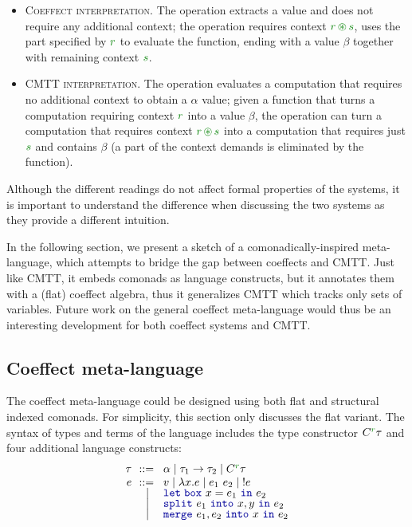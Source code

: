 \begin{itemize}
\item \textsc{Coeffect interpretation.} The  operation extracts a value
  and does not require any additional context; the  operation requires
  context $\cclrd{r}\,\cseq\,\cclrd{s}$, uses the part specified by $\cclrd{r}$ to
  evaluate the function, ending with a value $\beta$ together with remaining context
  $\cclrd{s}$.
\item \textsc{CMTT interpretation.} The  operation evaluates a computation
  that requires no additional context to obtain a $\alpha$ value; given a function that
  turns a computation requiring context $\cclrd{r}$ into a value $\beta$, the 
  operation can turn a computation that requires context $\cclrd{r}\,\cseq\,\cclrd{s}$
  into a computation that requires just $\cclrd{s}$ and contains $\beta$ (a part of the
  context demands is eliminated by the function).
\end{itemize}

\noindent
Although the different readings do not affect formal properties of the systems, it is important
to understand the difference when discussing the two systems as they provide a different
intuition.

In the following section, we present a sketch of a comonadically-inspired meta-language, which
attempts to bridge the gap between coeffects and CMTT. Just like CMTT, it embeds comonads as language
constructs, but it annotates them with a (flat) coeffect algebra, thus it generalizes CMTT which
tracks only sets of variables. Future work on the general coeffect meta-language would thus be an
interesting development for both coeffect systems and CMTT.


\subsection{Coeffect meta-language}

The coeffect meta-language could be designed using both flat and structural indexed comonads.
For simplicity, this section only discusses the flat variant. The syntax of types and terms
of the language includes the type constructor $\ctyp{\cclrd{r}}{\tau}$ and four additional
language constructs:
%
\begin{equation*}
\begin{array}{rcl}
 \tau &\narrow{::=}& \alpha \sep \tau_1 \rightarrow \tau_2 \sep \ctyp{\cclrd{r}}{\tau}\\
 e &\narrow{::=}& v \sep \lambda x.e \sep e_1~e_2 \sep !e    \\[-0.25em]
  &        \sep& \kvd{let\;box}~x=e_1~\kvd{in}~e_2           \\[-0.25em]
  &        \sep& \kvd{split}~e_1~\kvd{into}~x,y~\kvd{in}~e_2 \\[-0.25em]
  &        \sep& \kvd{merge}~e_1, e_2~\kvd{into}~x~\kvd{in}~e_2
\end{array}
\end{equation*}

